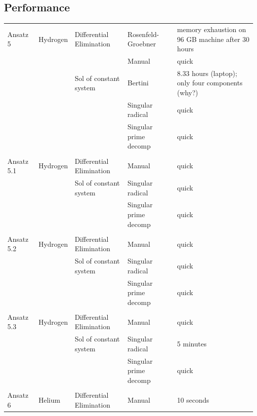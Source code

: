\documentclass{article}
\begin{document}
\subsection*{Performance}
\begin{tabular}{lllll}
Ansatz 5   &Hydrogen       &Differential Elimination &Rosenfeld-Groebner    &memory exhaustion on 96 GB machine after 30 hours\\
           &               &                         &Manual                &quick\\
           &               &Sol of constant system   &Bertini               &8.33 hours (laptop); only four components (why?)\\
           &               &                         &Singular radical      &quick\\
           &               &                         &Singular prime decomp &quick\\
           &               &                         &                      &\\
Ansatz 5.1 &Hydrogen       &Differential Elimination &Manual                &quick\\
           &               &Sol of constant system   &Singular radical      &quick\\
           &               &                         &Singular prime decomp &quick\\
           &               &                         &                      &\\
Ansatz 5.2 &Hydrogen       &Differential Elimination &Manual                &quick\\
           &               &Sol of constant system   &Singular radical      &quick\\
           &               &                         &Singular prime decomp &quick\\
           &               &                         &                      &\\
Ansatz 5.3 &Hydrogen       &Differential Elimination &Manual                &quick\\
           &               &Sol of constant system   &Singular radical      &5 minutes\\
           &               &                         &Singular prime decomp &quick\\
           &               &                         &                      &\\
Ansatz 6   &Helium         &Differential Elimination &Manual                &10 seconds\\

\end{tabular}
\end{document}
